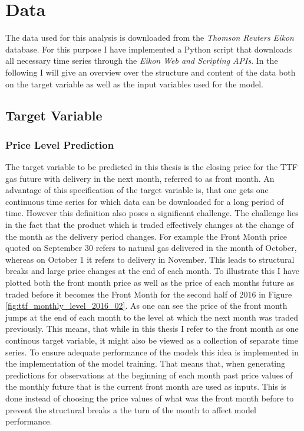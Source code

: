 \section{Data}\label{Sec:Data}
The data used for this analysis is downloaded from the \textit{Thomson Reuters Eikon} database. For this purpose I have implemented a Python script that downloads all necessary time series through the \textit{Eikon Web and Scripting APIs}. In the following I will give an overview over the structure and content of the data both on the target variable as well as the input variables used for the model. 
\subsection{Target Variable}
\subsubsection{Price Level Prediction}
The target variable to be predicted in this thesis is the closing price for the TTF gas future with delivery in the next month, referred to as front month. An advantage of this specification of the target variable is, that one gets one continuous time series for which data can be downloaded for a long period of time. However this definition also poses a significant challenge. The challenge lies in the fact that the product which is traded effectively changes at the change of the month as the delivery period changes. For example the Front Month price quoted on September 30 refers to natural gas delivered in the month of October, whereas on October 1 it refers to delivery in November. This leads to structural breaks and large price changes at the end of each month. To illustrate this I have plotted both the front month price as well as the price of each months future as traded before it becomes the Front Month for the second half of 2016 in Figure \ref{fig:ttf_monthly_level_2016_02}. As one can see the price of the front month jumps at the end of each month to the level at which the next month was traded previously.  This means, that while in this thesis I refer to the front month as one continous target variable, it might also be viewed as a collection of separate time series. To ensure adequate performance of the models this idea is implemented in the implementation of the model training. That means that, when generating predictions for observations at the beginning of each month past price values of the monthly future that is the current front month are used as inputs. This is done instead of choosing the price values of what was the front month before to prevent the structural breaks a the turn of the month to affect model performance.  

